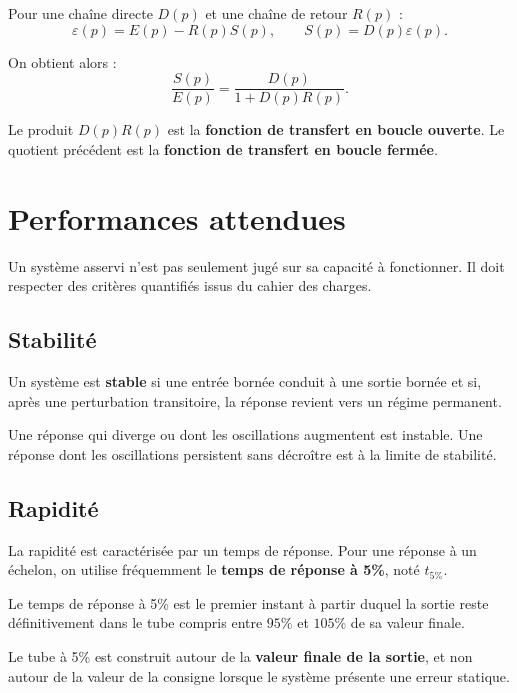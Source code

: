 Pour une chaîne directe $D(p)$ et une chaîne de retour $R(p)$ :
\[
\varepsilon(p)=E(p)-R(p)S(p),\qquad S(p)=D(p)\varepsilon(p).
\]

On obtient alors :
\[
\boxed{\frac{S(p)}{E(p)}=\frac{D(p)}{1+D(p)R(p)}}.
\]

Le produit $D(p)R(p)$ est la \textbf{fonction de transfert en boucle ouverte}. Le quotient précédent est la \textbf{fonction de transfert en boucle fermée}.

\section{Performances attendues}\label{sec:sa-performances}

Un système asservi n'est pas seulement jugé sur sa capacité à fonctionner. Il doit respecter des critères quantifiés issus du cahier des charges.

\SAReperePerformances

\subsection{Stabilité}

\begin{SAdefinition}
Un système est \textbf{stable} si une entrée bornée conduit à une sortie bornée et si, après une perturbation transitoire, la réponse revient vers un régime permanent.
\end{SAdefinition}

Une réponse qui diverge ou dont les oscillations augmentent est instable. Une réponse dont les oscillations persistent sans décroître est à la limite de stabilité.

\subsection{Rapidité}

La rapidité est caractérisée par un temps de réponse. Pour une réponse à un échelon, on utilise fréquemment le \textbf{temps de réponse à 5\%}, noté $t_{5\%}$.

\begin{SAdefinition}
Le temps de réponse à 5\% est le premier instant à partir duquel la sortie reste définitivement dans le tube compris entre $95\%$ et $105\%$ de sa valeur finale.
\end{SAdefinition}

\begin{SAattention}
Le tube à 5\% est construit autour de la \textbf{valeur finale de la sortie}, et non autour de la valeur de la consigne lorsque le système présente une erreur statique.
\end{SAattention}

